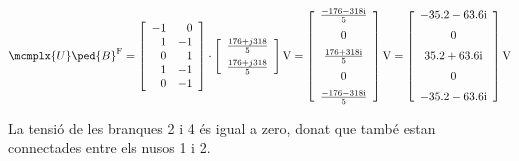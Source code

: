\begin{exemple}
    \[
     \mcmplx{U}\ped{B}^{\text{F}} =
     \begin{bmatrix}\begin{array}{rr}
        -1 & 0 \\ 1  & -1 \\  0 & 1 \\ 1 & -1 \\ 0 & -1
	 \end{array}\end{bmatrix}  \cdot
     \begin{bmatrix}\begin{array}{c}
        \frac{176 + j 318}{5} \\[2mm]
        \frac{176 + j 318}{5}
    \end{array}\end{bmatrix}\unit{V} =
    \begin{bmatrix}\begin{array}{c}
        \frac{\complexnum{-176 - j 318}}{5} \\[2mm]
        0  \\[2mm]
        \frac{\complexnum{176 + j 318}}{5} \\[2mm]
        0  \\[2mm]
        \frac{\complexnum{ -176 - j 318}}{5}
	\end{array}\end{bmatrix}\unit{V} =
	\begin{bmatrix}\begin{array}{c}
        \complexnum{-35,2 - j 63,6} \\[2mm]
        0  \\[2mm]
        \complexnum{35,2 + j 63,6} \\[2mm]
        0  \\[2mm]
        \complexnum{-35,2 - j 63,6}
	\end{array}\end{bmatrix}\unit{V}
    \]

    La tensió de les branques 2 i 4 és igual a zero, donat que també estan connectades entre els nusos 1 i 2.


\end{exemple}
